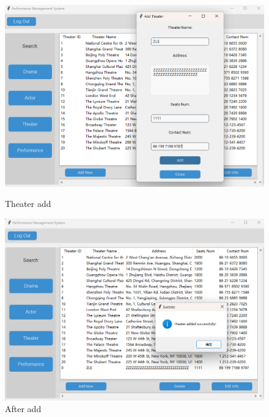 \documentclass[12pt]{article}
\begin{document}
\begin{figure}[H]
    \centering
    \begin{minipage}{0.48\textwidth}
        \centering
        \includegraphics[width=\textwidth]{39.png}
        \caption{Theater add} 
        \label{Figure 39}
    \end{minipage}
    \hfill
    \begin{minipage}{0.48\textwidth}
        \centering
        \includegraphics[width=\textwidth]{40.png}
        \caption{After add}
        \label{Figure 40}
    \end{minipage}
\end{figure}
\end{document}
